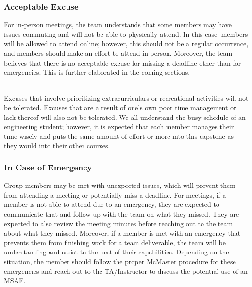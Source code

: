 \documentclass{article}
\begin{document}
\subsubsection*{Acceptable Excuse}


For in-person meetings, the team understands that some members may have issues commuting and will not be able to physically attend. In this case, members will be allowed to attend online; however, this should not be a regular occurrence, and members should make an effort to attend in person. Moreover, the team believes that there is no acceptable excuse for missing a deadline other than for emergencies. This is further elaborated in the coming sections. 

\\Excuses that involve prioritizing extracurriculars or recreational activities will not be tolerated.
Excuses that are a result of one's own poor time management or lack thereof will also not be tolerated.
We all understand the busy schedule of an engineering student; however, it is expected that each member manages their time wisely and puts the same amount of effort or more into this capstone as they would into their other courses.



\subsubsection*{In Case of Emergency}


Group members may be met with unexpected issues, which will prevent them from attending a meeting or potentially miss a deadline. For meetings, if a member is not able to attend due to an emergency, they are expected to communicate that and follow up with the team on what they missed. They are expected to also review the meeting minutes before reaching out to the team about what they missed. Moreover, if a member is met with an emergency that prevents them from finishing work for a team deliverable, the team will be understanding and assist to the best of their capabilities. Depending on the situation, the member should follow the proper McMaster procedure for these emergencies and reach out to the TA/Instructor to discuss the potential use of an MSAF.
\end{document}
